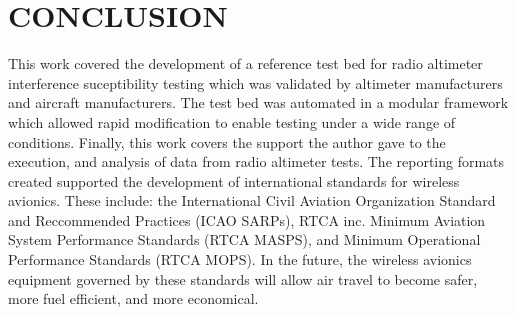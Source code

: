 %
%
%
%



\chapter{CONCLUSION \label{cha:Summary}}

This work covered the development of a reference test bed for radio altimeter interference suceptibility testing which was validated by altimeter manufacturers and aircraft manufacturers. The test bed was automated in a modular framework which allowed rapid modification to enable testing under a wide range of conditions. Finally, this work covers the support the author gave to the execution, and analysis of data from radio altimeter tests. The reporting formats created supported the development of international standards for wireless avionics. These include: the International Civil Aviation Organization Standard and Reccommended Practices (ICAO SARPs), RTCA inc. Minimum Aviation System Performance Standards (RTCA MASPS), and Minimum Operational Performance Standards (RTCA MOPS).  In the future, the wireless avionics equipment governed by these standards will allow air travel to become safer, more fuel efficient, and more economical. 